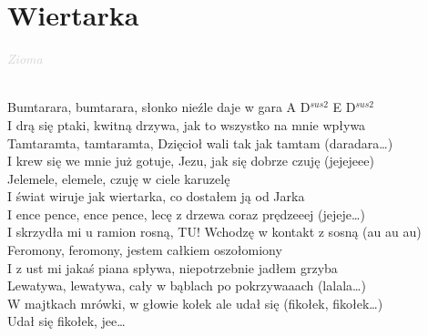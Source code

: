 \documentclass[a5paper, 10pt]{book}
\begin{document}
\section{Wiertarka}\textcolor{lightgray}{\textit{Zioma}}\\~\\
\begin{minipage}[t]{1\textwidth}
  Bumtarara, bumtarara, słonko nieźle daje w gara \hfill A D$^{sus2}$ E D$^{sus2}$\\
  I drą się ptaki, kwitną drzywa, jak to wszystko na mnie wpływa\\
  Tamtaramta, tamtaramta, Dzięcioł wali tak jak tamtam (daradara…)\\
  I krew się we mnie już gotuje, Jezu, jak się dobrze czuję (jejejeee)\\
  Jelemele, elemele, czuję w ciele karuzelę\\
  I świat wiruje jak wiertarka, co dostałem ją od Jarka\\
  \hspace*{5mm}I ence pence, ence pence, lecę z drzewa coraz prędzeeej (jejeje…)\\
  \hspace*{5mm}I skrzydła mi u ramion rosną, TU! Wchodzę w kontakt z sosną (au au au)\\
  Feromony, feromony, jestem całkiem oszołomiony\\
  I z ust mi jakaś piana spływa, niepotrzebnie jadłem grzyba\\
  \hspace*{5mm}Lewatywa, lewatywa, cały w bąblach po pokrzywaaach (lalala…)\\
  \hspace*{5mm}W majtkach mrówki, w głowie kołek ale udał się (fikołek, fikołek…)\\
  \hspace*{5mm}Udał się fikołek, jee…\\
\end{minipage}
\begin{minipage}[t]{0\textwidth}
\end{minipage}

\newpage
\end{document}
